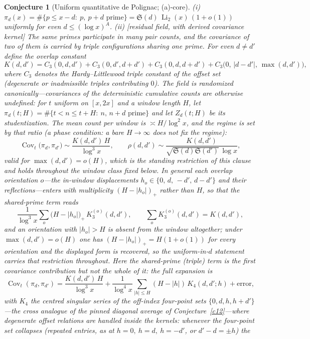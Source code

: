 \documentclass[11pt]{article}
\newtheorem{conjecture}{Conjecture}
\theoremstyle{definition}
\newcommand{\Li}{\operatorname{Li}}
\newcommand{\SG}{\mathfrak S}
\newcommand{\CT}{C_3}
\begin{document}
\setcounter{conjecture}{7}%
\begin{conjecture}[Uniform quantitative de Polignac;
(a)-core]\label{c16}
\emph{(i)} $\pi_d(x)=\#\{p\le x-d:\ p,\ p+d \text{ prime}\}
=\SG(d)\,\Li_2(x)\,(1+o(1))$ uniformly for even $d\le(\log x)^{A}$.
\emph{(ii)} [residual field, with derived covariance kernel]  The
same primes participate in many pair counts, and the covariance of
two of them is carried by triple configurations sharing one prime.
For even $d\neq d'$ define the overlap constant
\[
K(d,d')=\CT(0,d,d')+\CT(0,d',d+d')+\CT(0,d,d+d')
+\CT\bigl(0,\,|d-d'|,\,\max(d,d')\bigr),
\]
where $\CT$ denotes the Hardy--Littlewood triple constant of the
offset set (degenerate or inadmissible triples contributing $0$).
The field is randomized canonically---covariances of the
deterministic cumulative counts are otherwise undefined: for $t$ uniform on
$[x,2x]$ and a window length $H$, let
$\pi_d(t;H)=\#\{t<n\le t+H:\ n,\,n+d \text{ prime}\}$ and let
$Z_d(t;H)$ be its studentization.  The mean count per window is
$\asymp H/\log^2x$, and the regime is set by that ratio (a phase
condition: a bare $H\to\infty$ does not fix the regime):
\[
\operatorname{Cov}_t\bigl(\pi_d,\pi_{d'}\bigr)
\sim\frac{K(d,d')\,H}{\log^3x},
\qquad
\rho(d,d')\sim\frac{K(d,d')}{\sqrt{\SG(d)\SG(d')}\,\log x},
\]
valid for $\max(d,d')=o(H)$, which is the standing restriction of
this clause and holds throughout the window class fixed below.  In
general each overlap orientation $o$---the in-window displacements
$h_o\in\{0,\,d,\,-d',\,d-d'\}$ and their reflections---enters with
multiplicity $(H-|h_o|)_+$ rather than $H$, so that the shared-prime
term reads
\[
\frac1{\log^3x}\sum_{o}\bigl(H-|h_o|\bigr)_+\,K_3^{(o)}(d,d'),
\qquad \sum_o K_3^{(o)}(d,d')=K(d,d'),
\]
and an orientation with $|h_o|>H$ is absent from the window
altogether; under $\max(d,d')=o(H)$ one has $(H-|h_o|)_+=H(1+o(1))$
for every orientation and the displayed form is recovered, so the
uniform-in-$d$ statement carries that restriction throughout.
Here the shared-prime (triple) term is the \emph{first} covariance
contribution but not the whole of it: the full expansion is
\[
\operatorname{Cov}_t(\pi_d,\pi_{d'})
=\frac{K(d,d')\,H}{\log^3x}
+\frac1{\log^4x}\sum_{|h|\le H}(H-|h|)\,K_4(d,d';h)
+\text{error},
\]
with $K_4$ the centred singular series of the off-index four-point
sets $\{0,d,h,h+d'\}$---the cross analogue of the pinned diagonal
average of Conjecture~\ref{c12}---where degenerate offset relations
are handled inside the kernels: whenever the four-point set
collapses (repeated
entries, as at $h=0,\ h=d,\ h=-d'$, or $d'-d=\pm h$) the

\end{conjecture}
\end{document}
